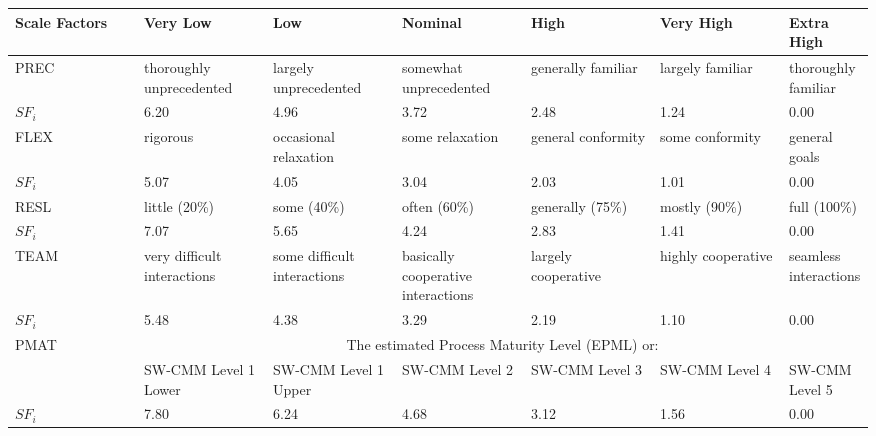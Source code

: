 \documentclass[10pt,a4paper,titlepage]{article}
\begin{document}
\noindent\begin{tabular}{|p{0.15\linewidth}|p{0.15\linewidth}|p{0.15\linewidth}|p{0.15\linewidth}|p{0.15\linewidth}|p{0.15\linewidth}|p{0.15\linewidth}|}
\hline 
Scale Factors & Very Low & Low & Nominal & High & Very High  & Extra High \\ 
\hline 
PREC & thoroughly unprecedented & largely unprecedented & somewhat unprecedented & generally familiar & largely familiar & thoroughly familiar \\ 
$SF_i$ & 6.20 & 4.96 & 3.72 & 2.48 & 1.24 & 0.00 \\

\hline 
FLEX & rigorous & occasional relaxation & some relaxation & general conformity & some conformity & general goals \\ 
$SF_i$ & 5.07 & 4.05 & 3.04 & 2.03 & 1.01 & 0.00 \\ 

\hline 
RESL & little (20\%) & some (40\%) & often (60\%) & generally (75\%) & mostly (90\%) & full (100\%) \\ 
$SF_i$ & 7.07 & 5.65 & 4.24 & 2.83 & 1.41 & 0.00 \\

\hline 
TEAM & very difficult interactions & some difficult interactions & basically cooperative interactions & largely cooperative & highly cooperative & seamless interactions \\ 
$SF_i$ & 5.48 & 4.38 & 3.29 & 2.19 & 1.10 & 0.00 \\

\hline 
PMAT & \multicolumn{6}{|c|}{The estimated Process Maturity Level (EPML) or:}\\
\cline{2-7}
 & SW-CMM Level 1 Lower & SW-CMM Level 1 Upper & SW-CMM Level 2 & SW-CMM Level 3 & SW-CMM Level 4 & SW-CMM Level 5 \\
$SF_i$ & 7.80 & 6.24 & 4.68 & 3.12 & 1.56 & 0.00 \\
\hline 
\end{tabular}
\end{document}
